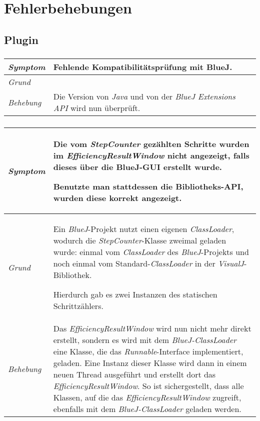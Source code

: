 \documentclass[a4paper]{report}
\begin{document}
 
\chapter{Fehlerbehebungen}

\section{Plugin}

\subsection{}
\begin{tabular}{p{2.5cm}  p{11.5cm}}
  \hline
  \textit{Symptom} & Fehlende Kompatibilitätsprüfung mit BlueJ. \\
  \hline
  \textit{Grund} & \\
  \hline
  \textit{Behebung} & Die Version von \emph{Java} und von der \emph{BlueJ Extensions API} wird nun überprüft. \\
  \hline
\end{tabular}

\subsection{}
\begin{tabular}{p{2.5cm}  p{11.5cm}}
  \hline
  \textit{Symptom} & Die vom \emph{StepCounter} gezählten Schritte wurden im \emph{EfficiencyResultWindow} nicht angezeigt, falls dieses über die BlueJ-GUI erstellt wurde.
  
  Benutzte man stattdessen die Bibliotheks-API, wurden diese korrekt angezeigt. \\
  \hline
  \textit{Grund} & Ein \emph{BlueJ}-Projekt nutzt einen eigenen \emph{ClassLoader}, wodurch die \emph{StepCounter}-Klasse zweimal geladen wurde: einmal vom \emph{ClassLoader} des \emph{BlueJ}-Projekts und noch einmal vom Standard-\emph{ClassLoader} in der \emph{VisualJ}-Bibliothek.
  
  Hierdurch gab es zwei Instanzen des statischen Schrittzählers. \\
  \hline
  \textit{Behebung} & Das \emph{EfficiencyResultWindow} wird nun nicht mehr direkt erstellt, sondern es wird mit dem \emph{BlueJ-ClassLoader} eine Klasse, die das \emph{Runnable}-Interface implementiert, geladen. Eine Instanz dieser Klasse wird dann in einem neuen Thread ausgeführt und erstellt dort das \emph{EfficiencyResultWindow}.  So ist sichergestellt, dass alle Klassen, auf die das \emph{EfficiencyResultWindow} zugreift, ebenfalls mit dem \emph{BlueJ-ClassLoader} geladen werden. \\
  \hline
\end{tabular}
\end{document}
